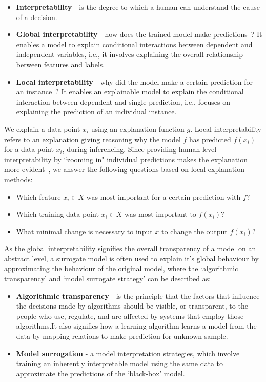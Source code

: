 \begin{itemize}[noitemsep]
    \item \textbf{Interpretability} - is the degree to which a human can understand the cause of a decision.
    \item \textbf{Global interpretability} - how does the trained model make predictions~\cite{molnar2019interpretable}? It enables a model to explain conditional interactions between dependent and independent variables, i.e., it involves explaining the overall relationship between features and labels.
    \item \textbf{Local interpretability} - why did the model make a certain prediction for an instance~\cite{molnar2019interpretable}? It enables an explainable model to explain the conditional interaction between dependent and single prediction, i.e., focuses on explaining the prediction of an individual instance. 
\end{itemize}

\hspace*{3.5mm} We explain a data point $x_i$ using an explanation function $g$. Local interpretability refers to an explanation giving reasoning why the model $f$ has predicted $f(x_i)$ for a data point $x_i$, during inferencing. Since providing human-level interpretability by ``zooming in" individual predictions makes the explanation more evident~\cite{ribeiro2018anchors}, we answer the following questions based on local explanation methods: 

\begin{itemize}[noitemsep]
    \item Which feature $x_i \in X$ was most important for a certain prediction with $f$? 
    \item Which training data point $x_i \in X$ was most important to $f(x_i)$? 
    \item What minimal change is necessary to input $x$ to change the output $f(x_i)$?
\end{itemize}

\hspace*{3.5mm} As the global interpretability signifies the overall transparency of a model on an abstract level, a surrogate model is often used to explain it's global behaviour by approximating the behaviour of the original  model, where the `algorithmic transparency' and `model surrogate strategy' can be described as: 

\begin{itemize}[noitemsep]
    \item {\textbf{Algorithmic transparency}} - is the principle that the factors that influence the decisions made by algorithms should be visible, or transparent, to the people who use, regulate, and are affected by systems that employ those algorithms.It also signifies how a learning algorithm learns a model from the data by mapping relations to make prediction for unknown sample.
    \item \textbf{Model surrogation} - a model interpretation strategies, which involve training an inherently interpretable model using the same data to approximate the predictions of the `black-box' model. 
\end{itemize}

